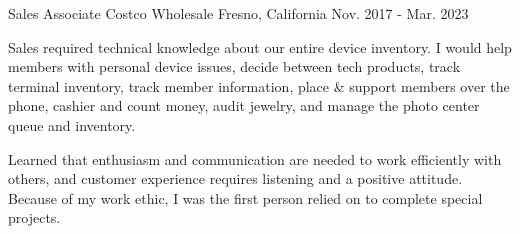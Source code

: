 \begin{cventries}
  \cventry
    {Sales Associate} %
    {Costco Wholesale} %
    {Fresno, California} %
    {Nov. 2017 - Mar. 2023} %
    {
      \begin{cvitems} %
	  \item {Sales required technical knowledge about our entire device inventory. I would help members with personal device issues, decide between tech products, track terminal inventory, track member information, place \& support members over the phone, cashier and count money, audit jewelry, and manage the photo center queue and inventory.}
		  \item {Learned that enthusiasm and communication are needed to work efficiently with others, and customer experience requires listening and a positive attitude. Because of my work ethic, I was the first person relied on to complete special projects.} 
	  \end{cvitems}
	 }
\end{cventries}
